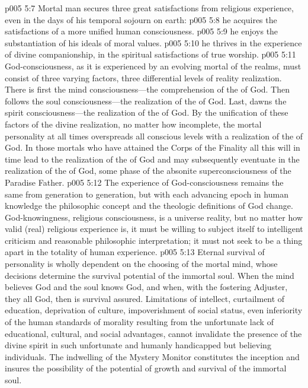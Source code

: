 \pc \vs p005 5:7 Mortal man secures three great satisfactions from religious experience, even in the days of his temporal sojourn on earth:
\pc \vs p005 5:8 \bibnobreakspace {} he acquires the satisfactions of a more unified human consciousness.
\vs p005 5:9 \bibnobreakspace {} he enjoys the substantiation of his ideals of moral values.
\vs p005 5:10 \bibnobreakspace {} he thrives in the experience of divine companionship, in the spiritual satisfactions of true worship.
\pc \vs p005 5:11 God\hyp{}consciousness, as it is experienced by an evolving mortal of the realms, must consist of three varying factors, three differential levels of reality realization. There is first the mind consciousness---the comprehension of the  of God. Then follows the soul consciousness---the realization of the  of God. Last, dawns the spirit consciousness---the realization of the  of God. By the unification of these factors of the divine realization, no matter how incomplete, the mortal personality at all times overspreads all conscious levels with a realization of the  of God. In those mortals who have attained the Corps of the Finality all this will in time lead to the realization of the  of God and may subsequently eventuate in the realization of the  of God, some phase of the absonite superconsciousness of the Paradise Father.
\vs p005 5:12 The experience of God\hyp{}consciousness remains the same from generation to generation, but with each advancing epoch in human knowledge the philosophic concept and the theologic definitions of God  change. God\hyp{}knowingness, religious consciousness, is a universe reality, but no matter how valid (real) religious experience is, it must be willing to subject itself to intelligent criticism and reasonable philosophic interpretation; it must not seek to be a thing apart in the totality of human experience.
\pc \vs p005 5:13 Eternal survival of personality is wholly dependent on the choosing of the mortal mind, whose decisions determine the survival potential of the immortal soul. When the mind believes God and the soul knows God, and when, with the fostering Adjuster, they all  God, then is survival assured. Limitations of intellect, curtailment of education, deprivation of culture, impoverishment of social status, even inferiority of the human standards of morality resulting from the unfortunate lack of educational, cultural, and social advantages, cannot invalidate the presence of the divine spirit in such unfortunate and humanly handicapped but believing individuals. The indwelling of the Mystery Monitor constitutes the inception and insures the possibility of the potential of growth and survival of the immortal soul.

